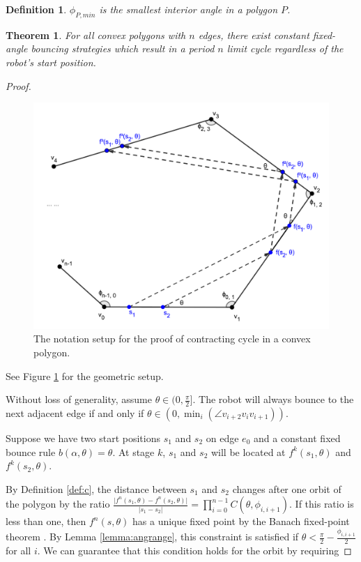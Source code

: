 \documentclass[]{article}
\newtheorem{definition}{Definition}
\newtheorem{theorem}{Theorem}
\begin{document}
\begin{definition}
$\phi_{P,min}$ is the smallest interior angle in a polygon $P$.
\end{definition}

\begin{theorem} \label{thm:convex}
For all convex polygons with $n$ edges, there exist constant fixed-angle bouncing
strategies which result in a period $n$ limit cycle regardless of the robot's start position.
\end{theorem}
\begin{proof}

\begin{figure}
    \includegraphics[width=0.6\linewidth]{figures/convex_cycle.png}
    \centering
    \caption{The notation setup for the proof of contracting cycle in a convex polygon.\label{fig:conv_cycle}}
    \centering
\end{figure}

See Figure \ref{fig:conv_cycle} for the geometric setup.

Without loss of generality, assume $\theta \in (0, \frac{\pi}{2}]$. The robot will always bounce
to the next adjacent edge if and only if
$\theta \in (0, \min_{i}(\angle v_{i+2}v_{i}v_{i+1}))$.

Suppose we have two start positions $s_1$ and $s_2$ on edge $e_0$ and a constant fixed bounce 
rule $b(\alpha, \theta) = \theta$.
At stage $k$, $s_1$ and $s_2$ will be located at $f^{k}(s_1,\theta)$ and
$f^{k}(s_2,\theta)$. 

By Definition \ref{def:c}, the distance between $s_1$ and $s_2$ changes after one orbit of the polygon by the
ratio $\frac{\lvert f^{n}(s_1, \theta) - f^{n}(s_2, \theta) \rvert}{ \lvert s_1
- s_2 \rvert } = \prod_{i = 0}^{n-1}
C(\theta, \phi_{i, i+1})$. If this ratio is less than one, then $f^n(s,\theta)$ has a unique fixed point by the Banach fixed-point theorem
\cite{Granas2003}. By Lemma \ref{lemma:angrange}, this constraint is satisfied if  
$\theta < \frac{\pi}{2}-\frac{\phi_{i, i+1}}{2}$ for all $i$. We can guarantee that this
condition holds for the orbit by requiring


\end{proof}
\end{document}
